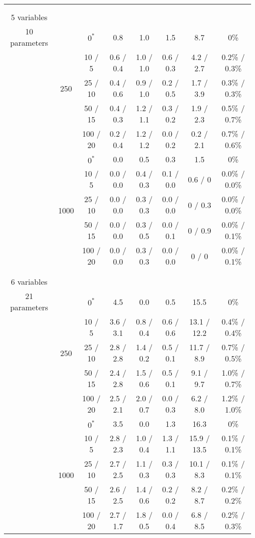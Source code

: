 \documentclass[twoside,11pt]{article}
\begin{document}
\begin{table}[H]
\begin{tabular}{ c | c | c || c | c | c | c | c  }
\hhline{=|=|=||=|=|=|=|=}

\multirow{10}{*}{\thead{\textbf{earthquake} \\ \\ 5 variables \\ 10 parameters}} & \multirow{5}{*}{250}

& $0^*$ & 0.8 & 1.0 & 1.5 & 8.7 & 0\% \\
& & 10 / 5 & 0.6 / 0.4 & 1.0 / 1.0 & 0.6 / 0.3 & 4.2 / 2.7 & 0.2\% / 0.3\% \\
& & 25 / 10 & 0.4 / 0.6 & 0.9 / 1.0 & 0.2 / 0.5 & 1.7 / 3.9 & 0.3\% / 0.3\% \\
& & 50 / 15 & 0.4 / 0.3 & 1.2 / 1.1 & 0.3 / 0.2 & 1.9 / 2.3 & 0.5\% / 0.7\% \\
& & 100 / 20 & 0.2 / 0.4 & 1.2 / 1.2 & 0.0 / 0.2 & 0.2 / 2.1 & 0.7\% / 0.6\% \\

\hhline{~|-|-||-|-|-|-|-} 
& \multirow{5}{*}{1000}

& $0^*$ & 0.0 & 0.5 & 0.3 & 1.5 & 0\% \\
& & 10 / 5 & 0.0 / 0.0 & 0.4 / 0.3 & 0.1 / 0.0 & 0.6 / 0 & 0.0\% / 0.0\% \\
& & 25 / 10 & 0.0 / 0.0 & 0.3 / 0.3 & 0.0 / 0.0 & 0 / 0.3 & 0.0\% / 0.0\% \\
& & 50 / 15 & 0.0 / 0.0 & 0.3 / 0.5 & 0.0 / 0.1 & 0 / 0.9 & 0.0\% / 0.1\% \\
& & 100 / 20 & 0.0 / 0.0 & 0.3 / 0.3 & 0.0 / 0.0 & 0 / 0 & 0.0\% / 0.1\% \\

\hhline{=|=|=||=|=|=|=|=}
\multirow{10}{*}{\thead{\textbf{survey} \\ \\ 6 variables \\ 21 parameters}} & \multirow{5}{*}{250} 

& $0^*$ & 4.5 & 0.0 & 0.5 & 15.5 & 0\% \\
& & 10 / 5 & 3.6 / 3.1 & 0.8 / 0.4 & 0.6 / 0.6 & 13.1 / 12.2 & 0.4\% / 0.4\% \\
& & 25 / 10 & 2.8 / 2.8 & 1.4 / 0.2 & 0.5 / 0.1 & 11.7 / 8.9 & 0.7\% / 0.5\% \\
& & 50 / 15 & 2.4 / 2.8 & 1.5 / 0.6 & 0.5 / 0.1 & 9.1 / 9.7 & 1.0\% / 0.7\% \\
& & 100 / 20 & 2.5 / 2.1 & 2.0 / 0.7 & 0.0 / 0.3 & 6.2 / 8.0 & 1.2\% / 1.0\% \\

\hhline{~|-|-||-|-|-|-|-} 
& \multirow{5}{*}{1000}
& $0^*$ & 3.5 & 0.0 & 1.3 & 16.3 & 0\% \\
& & 10 / 5 & 2.8 / 2.3 & 1.0 / 0.4 & 1.3 / 1.1 & 15.9 / 13.5 & 0.1\% / 0.1\% \\
& & 25 / 10 & 2.7 / 2.5 & 1.1 / 0.3 & 0.3 / 0.3 & 10.1 / 8.3 & 0.1\% / 0.1\% \\
& & 50 / 15 & 2.6 / 2.5 & 1.4 / 0.6 & 0.2 / 0.2 & 8.2 / 8.7 & 0.2\% / 0.2\% \\
& & 100 / 20 & 2.7 / 1.7 & 1.8 / 0.5 & 0.0 / 0.4 & 6.8 / 8.5 & 0.2\% / 0.3\% \\


\end{tabular}
\end{table}
\end{document}
